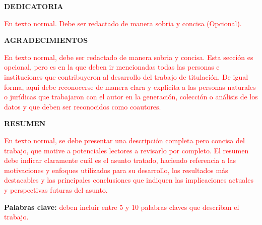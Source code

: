 \documentclass[journal]{IEEEtran}
\begin{document}
\newpage

\begin{center}
\textbf{\fontsize{14}{16}\selectfont DEDICATORIA}\\
\end{center}
\vspace{10pt}

{
\setlength{\parindent}{3em}
\hspace{1pt}
\fontsize{12}{14}\selectfont 

\textcolor{red}{En texto normal. Debe ser redactado de manera sobria y concisa (Opcional).}

}
\newpage


\begin{center}
\textbf{\fontsize{14}{16}\selectfont AGRADECIMIENTOS}\\
\end{center}
\vspace{10pt}
\fontsize{12}{14}\selectfont 

{
\setlength{\parindent}{3em}
\hspace{1pt}

\textcolor{red}{En texto normal, debe ser redactado de manera sobria y concisa. Esta sección es opcional, pero es en la que deben ir mencionadas todas las personas e instituciones que contribuyeron al desarrollo del trabajo de titulación. De igual forma, aquí debe reconocerse de manera clara y explícita a las personas naturales o jurídicas que trabajaron con el autor en la generación, colección o análisis de los datos y que deben ser reconocidos como coautores.}


}
\newpage

\begin{center}
\textbf{\fontsize{14}{16}\selectfont RESUMEN}\\
\vspace{10pt}
\end{center}
\fontsize{12}{14}\selectfont 
{
\setlength{\parindent}{3em}
\hspace{1pt}
\textcolor{red}{En texto normal, se debe presentar una descripción completa pero concisa del trabajo, que motive a potenciales lectores a revisarlo por completo. El resumen debe indicar claramente cuál es el asunto tratado, haciendo referencia a las motivaciones y enfoques utilizados para su desarrollo, los resultados más destacables y las principales conclusiones que indiquen las implicaciones actuales y perspectivas futuras del asunto.}\\
}
\vspace{10pt}
\begin{center}  
\textbf{\fontsize{12}{14}\selectfont Palabras clave:} \textcolor{red}{deben incluir entre 5 y 10 palabras claves que describan el trabajo.}
\end{center}
\end{document}
